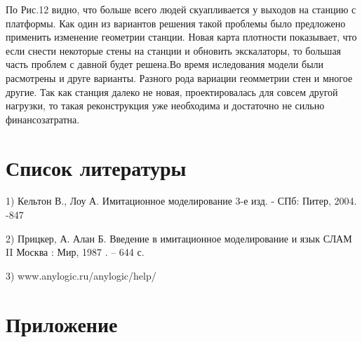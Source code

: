 \documentclass[12pt]{article}
\begin{document}
		По Рис.12 видно, что больше всего людей скуапливается у выходов на станцию с платформы. Как один из вариантов решения такой проблемы было предложено применить изменение геометрии станции. Новая карта плотности показывает, что если снести некоторые стены на станции и обновить экскалаторы, то большая часть проблем с давной будет решена.Во  время иследования модели были расмотрены и друге варианты. Разного рода вариации геомметрии стен и многое другие. Так как станция далеко не новая,  проектировалась для совсем другой нагрузки, то такая реконструкция  уже необходима и достаточно не сильно финансозатратна. 
		


	

\part*{\centering Список литературы}

			
	
\hspace{\parindent} \hspace{\parindent}


1) Кельтон В., Лоу А. Имитационное моделирование 3-е изд. - СПб: Питер, 2004. -847 

2) Прицкер, А. Алан Б. Введение в имитационное моделирование и язык СЛАМ II  Москва : Мир, 1987 . – 644 с. 

3) www.anylogic.ru/anylogic/help/

	\newpage	%
	\part*{Приложение}
		\begin{lstlisting}[language=PHP]

	\end{lstlisting}




%

	\newpage	
\end{document}
